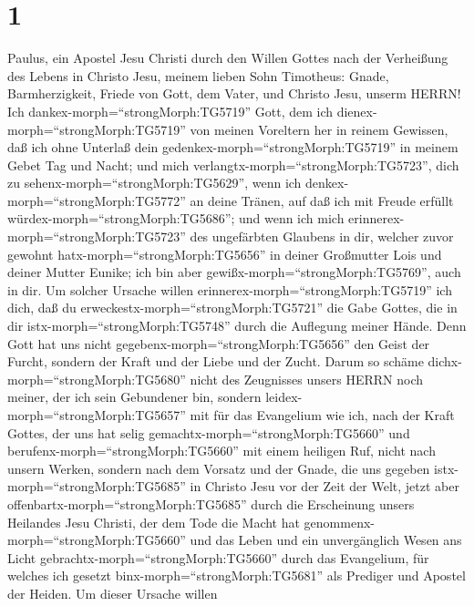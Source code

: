 \hypertarget{section}{%
\section{1}\label{section}}

 Paulus, ein Apostel Jesu Christi durch den Willen Gottes
nach der Verheißung des Lebens in Christo Jesu,  meinem
lieben Sohn Timotheus: Gnade, Barmherzigkeit, Friede von Gott, dem
Vater, und Christo Jesu, unserm HERRN!  Ich
dankex-morph=``strongMorph:TG5719'' Gott, dem ich
dienex-morph=``strongMorph:TG5719'' von meinen Voreltern her in reinem
Gewissen, daß ich ohne Unterlaß dein
gedenkex-morph=``strongMorph:TG5719'' in meinem Gebet Tag und Nacht;
 und mich verlangtx-morph=``strongMorph:TG5723'', dich zu
sehenx-morph=``strongMorph:TG5629'', wenn ich
denkex-morph=``strongMorph:TG5772'' an deine Tränen, auf daß ich mit
Freude erfüllt würdex-morph=``strongMorph:TG5686'';  und
wenn ich mich erinnerex-morph=``strongMorph:TG5723'' des ungefärbten
Glaubens in dir, welcher zuvor gewohnt hatx-morph=``strongMorph:TG5656''
in deiner Großmutter Lois und deiner Mutter Eunike; ich bin aber
gewißx-morph=``strongMorph:TG5769'', auch in dir.  Um
solcher Ursache willen erinnerex-morph=``strongMorph:TG5719'' ich dich,
daß du erweckestx-morph=``strongMorph:TG5721'' die Gabe Gottes, die in
dir istx-morph=``strongMorph:TG5748'' durch die Auflegung meiner Hände.
 Denn Gott hat uns nicht
gegebenx-morph=``strongMorph:TG5656'' den Geist der Furcht, sondern der
Kraft und der Liebe und der Zucht.  Darum so schäme
dichx-morph=``strongMorph:TG5680'' nicht des Zeugnisses unsers HERRN
noch meiner, der ich sein Gebundener bin, sondern
leidex-morph=``strongMorph:TG5657'' mit für das Evangelium wie ich, nach
der Kraft Gottes,  der uns hat selig
gemachtx-morph=``strongMorph:TG5660'' und
berufenx-morph=``strongMorph:TG5660'' mit einem heiligen Ruf, nicht nach
unsern Werken, sondern nach dem Vorsatz und der Gnade, die uns gegeben
istx-morph=``strongMorph:TG5685'' in Christo Jesu vor der Zeit der Welt,
 jetzt aber offenbartx-morph=``strongMorph:TG5685'' durch
die Erscheinung unsers Heilandes Jesu Christi, der dem Tode die Macht
hat genommenx-morph=``strongMorph:TG5660'' und das Leben und ein
unvergänglich Wesen ans Licht gebrachtx-morph=``strongMorph:TG5660''
durch das Evangelium,  für welches ich gesetzt
binx-morph=``strongMorph:TG5681'' als Prediger und Apostel der Heiden.
 Um dieser Ursache willen
